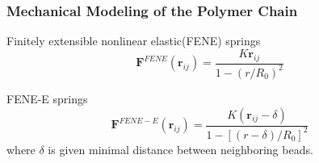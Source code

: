 
\begin{frame}
  \frametitle{Mechanical Modeling of the Polymer Chain}
Finitely extensible nonlinear elastic(FENE) springs
\begin{equation}\label{equ:fene}
 \mathbf{F}^{FENE}(\mathbf{r}_{ij})=\frac{K\mathbf{r}_{ij}}{1-(r/R_0)^2}
\end{equation}

FENE-E springs
  \begin{equation}\label{equ:feneE}
 \mathbf{F}^{FENE-E}(\mathbf{r}_{ij})=\frac{K(\mathbf{r}_{ij}-\delta)}{1-[(r-\delta)/R_0]^2}
\end{equation}
where $\delta$ is given minimal distance between neighboring beads.
\end{frame}


